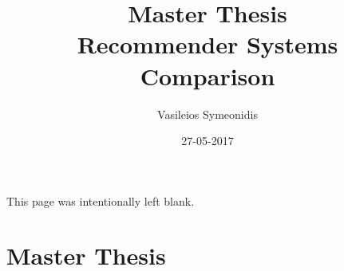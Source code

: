 \documentclass{article}
\title{Master Thesis \\ Recommender Systems Comparison}
\date{27-05-2017}
\author{Vasileios Symeonidis}
\begin{document}

\maketitle
{}
\newpage
\tableofcontents
{}
\newpage
{}
\begin{center}
This page was intentionally left blank.
\end{center}
\newpage
{}

\part{Master Thesis}





\newpage











%	
%	
\end{document}
